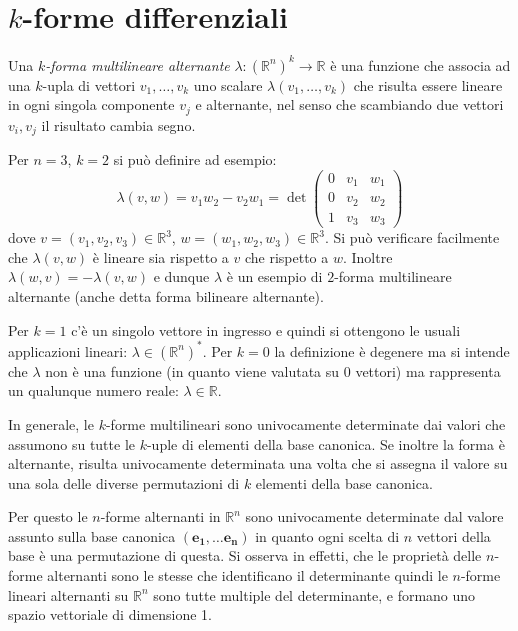 \documentclass[italian,a4paper]{scrartcl}
\newcommand{\RR}{{\mathbb R}}
\renewcommand{\vec}{\mathbf}
\begin{document}
\section{$k$-forme differenziali}

Una \emph{$k$-forma multilineare alternante} $\lambda\colon (\RR^n)^k \to \RR$ è
una funzione che associa ad una $k$-upla di vettori $v_1,\dots,v_k$
uno scalare $\lambda(v_1,\dots, v_k)$ che risulta essere lineare in
ogni singola componente $v_j$ e alternante, nel senso che scambiando
due vettori $v_i, v_j$ il risultato cambia segno.

\begin{example}
Per $n=3$, $k=2$ si può definire ad esempio:
\[
 \lambda(v, w) = v_1w_2 - v_2w_1 
= \det\begin{pmatrix}
0 & v_1 & w_1\\
0 & v_2 & w_2\\
1 & v_3 & w_3
\end{pmatrix}
\]
dove $v=(v_1,v_2,v_3) \in \RR^3$, $w=(w_1,w_2,w_3) \in \RR^3$. Si può
verificare facilmente che $\lambda(v,w)$ è lineare sia rispetto a $v$
che rispetto a $w$. Inoltre $\lambda(w,v) = -\lambda(v,w)$ e dunque
$\lambda$ è un esempio di $2$-forma multilineare alternante (anche
detta forma bilineare alternante).
\end{example}

Per $k=1$ c'è un singolo vettore in ingresso e quindi si ottengono le
usuali applicazioni lineari: $\lambda \in (\RR^n)^*$. Per $k=0$ la definizione è
degenere ma si intende che $\lambda$ non è una funzione (in quanto
viene valutata su $0$ vettori) ma rappresenta un qualunque numero reale:
$\lambda\in \mathbb R$.

In generale, 
le $k$-forme multilineari sono univocamente determinate dai valori che
assumono su tutte le $k$-uple di elementi della base canonica. Se
inoltre la forma è alternante, risulta univocamente determinata una
volta che si assegna il valore su una sola delle diverse permutazioni
di $k$ elementi della base canonica. 

Per questo le $n$-forme alternanti in
$\RR^n$ sono univocamente determinate dal valore assunto sulla base
canonica $(\vec {e_1},\dots \vec{e_n})$ in quanto ogni scelta di $n$
vettori della base è una permutazione di questa. 
Si osserva in effetti, che le proprietà
delle $n$-forme alternanti sono le stesse che identificano il determinante
quindi le
$n$-forme lineari alternanti su $\RR^n$ sono tutte multiple del
determinante, e formano uno spazio vettoriale di dimensione 1.
\end{document}

